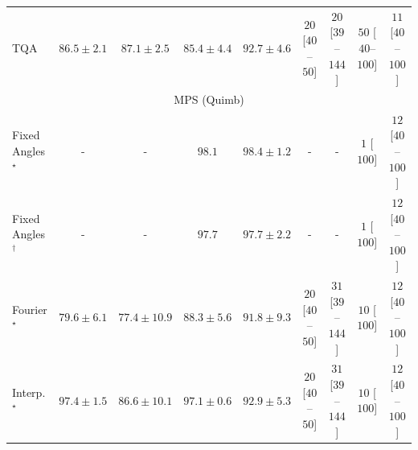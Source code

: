 \begin{tabular}{l|cccc|cccc|}
TQA & {\cellcolor[HTML]{8C80BB}} \color[HTML]{F1F1F1} $86.5\pm 2.1$ & {\cellcolor[HTML]{8C79B8}} \color[HTML]{F1F1F1} $87.1\pm 2.5$ & {\cellcolor[HTML]{8C8FC2}} \color[HTML]{F1F1F1} $85.4\pm 4.4$ & {\cellcolor[HTML]{863394}} \color[HTML]{F1F1F1} $92.7\pm 4.6$ & {\cellcolor[HTML]{FDE4E1}} \color[HTML]{000000} $20$ [$40$--$50$] & {\cellcolor[HTML]{FDE4E1}} \color[HTML]{000000} $20$ [$39$--$144$] & {\cellcolor[HTML]{FCC0BF}} \color[HTML]{000000} $50$ [$40$--$100$] & {\cellcolor[HTML]{FEEEEA}} \color[HTML]{000000} $11$ [$40$--$100$] \\
\cline{1-9}
\multicolumn{9}{c}{\rule{0pt}{8pt}MPS (Quimb)} \\
\midrule
Fixed Angles$^\star$ & {\cellcolor[HTML]{000000}} \color[HTML]{F1F1F1} {\cellcolor{white}} \color{black} - & {\cellcolor[HTML]{000000}} \color[HTML]{F1F1F1} {\cellcolor{white}} \color{black} - & {\cellcolor[HTML]{6E2706}} \color[HTML]{F1F1F1} $98.1$ & {\cellcolor[HTML]{692606}} \color[HTML]{F1F1F1} $98.4\pm 1.2$ & {\cellcolor[HTML]{000000}} \color[HTML]{F1F1F1} {\cellcolor{white}} \color{black} - & {\cellcolor[HTML]{000000}} \color[HTML]{F1F1F1} {\cellcolor{white}} \color{black} - & {\cellcolor[HTML]{FFF7F3}} \color[HTML]{000000} $1$ [$100$] & {\cellcolor[HTML]{FEECE9}} \color[HTML]{000000} $12$ [$40$--$100$] \\
Fixed Angles$^\dagger$ & {\cellcolor[HTML]{000000}} \color[HTML]{F1F1F1} {\cellcolor{white}} \color{black} - & {\cellcolor[HTML]{000000}} \color[HTML]{F1F1F1} {\cellcolor{white}} \color{black} - & {\cellcolor[HTML]{742905}} \color[HTML]{F1F1F1} $97.7$ & {\cellcolor[HTML]{742905}} \color[HTML]{F1F1F1} $97.7\pm 2.2$ & {\cellcolor[HTML]{000000}} \color[HTML]{F1F1F1} {\cellcolor{white}} \color{black} - & {\cellcolor[HTML]{000000}} \color[HTML]{F1F1F1} {\cellcolor{white}} \color{black} - & {\cellcolor[HTML]{FFF7F3}} \color[HTML]{000000} $1$ [$100$] & {\cellcolor[HTML]{FEECE9}} \color[HTML]{000000} $12$ [$40$--$100$] \\
Fourier$^\star$ & {\cellcolor[HTML]{FED36F}} \color[HTML]{000000} $79.6\pm 6.1$ & {\cellcolor[HTML]{FEE596}} \color[HTML]{000000} $77.4\pm 10.9$ & {\cellcolor[HTML]{EB6F14}} \color[HTML]{F1F1F1} $88.3\pm 5.6$ & {\cellcolor[HTML]{CB4B02}} \color[HTML]{F1F1F1} $91.8\pm 9.3$ & {\cellcolor[HTML]{FDE4E1}} \color[HTML]{000000} $20$ [$40$--$50$] & {\cellcolor[HTML]{FDD8D5}} \color[HTML]{000000} $31$ [$39$--$144$] & {\cellcolor[HTML]{FEEEEB}} \color[HTML]{000000} $10$ [$100$] & {\cellcolor[HTML]{FEECE9}} \color[HTML]{000000} $12$ [$40$--$100$] \\
Interp.$^\star$ & {\cellcolor[HTML]{782A05}} \color[HTML]{F1F1F1} $97.4\pm 1.5$ & {\cellcolor[HTML]{F5841E}} \color[HTML]{F1F1F1} $86.6\pm 10.1$ & {\cellcolor[HTML]{7C2C05}} \color[HTML]{F1F1F1} $97.1\pm 0.6$ & {\cellcolor[HTML]{BB4403}} \color[HTML]{F1F1F1} $92.9\pm 5.3$ & {\cellcolor[HTML]{FDE4E1}} \color[HTML]{000000} $20$ [$40$--$50$] & {\cellcolor[HTML]{FDD8D5}} \color[HTML]{000000} $31$ [$39$--$144$] & {\cellcolor[HTML]{FEEEEB}} \color[HTML]{000000} $10$ [$100$] & {\cellcolor[HTML]{FEECE9}} \color[HTML]{000000} $12$ [$40$--$100$] \\

\end{tabular}
